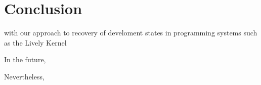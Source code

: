 \chapter{Conclusion} \label{chapter:CONCLUSION}


with our approach to recovery of develoment states in programming systems such as the Lively Kernel 




In the future, 

Nevertheless,





% 



